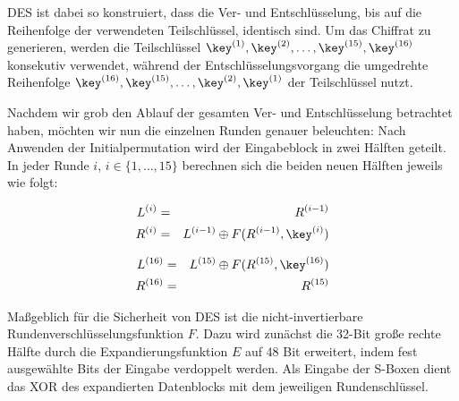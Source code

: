 DES ist dabei so konstruiert, dass die Ver- und Entschlüsselung, bis auf die Reihenfolge der verwendeten Teilschlüssel, identisch sind. Um das Chiffrat zu generieren, werden die Teilschlüssel $\key^{(1)},\key^{(2)},\dots,\key^{(15)},\key^{(16)}$ konsekutiv verwendet, während der Entschlüsselungsvorgang die umgedrehte Reihenfolge $\key^{(16)},\key^{(15)},\dots,\key^{(2)},\key^{(1)}$ der Teilschlüssel nutzt.

Nachdem wir grob den Ablauf der gesamten Ver- und Entschlüsselung betrachtet haben, möchten wir nun die einzelnen Runden genauer beleuchten: Nach Anwenden der Initialpermutation wird der Eingabeblock in zwei Hälften geteilt. In jeder Runde $i$, $i \in \{1,\ldots,15\}$ berechnen sich die beiden neuen Hälften jeweils wie folgt:

\noindent
\begin{minipage}[h]{.45\textwidth}
	\begin{eqnarray*}
		L^{(i)}	& =	& R^{(i-1)} \\
		R^{(i)} 	& =	& L^{(i-1)} \oplus F(R^{(i-1)}, \key^{(i)})
	\end{eqnarray*}
\end{minipage}\hfill
\begin{minipage}[h]{.45\textwidth}
	\begin{eqnarray*}
		L^{(16)} 	& =	& L^{(15)} \oplus F(R^{(15)}, \key^{(16)}) \\
		R^{(16)}	& =	& R^{(15)}
	\end{eqnarray*}
\end{minipage}
\bigskip

Maßgeblich für die Sicherheit von DES ist die nicht-invertierbare Rundenverschlüsselungsfunktion $F$. Dazu wird zunächst die 32-Bit große rechte Hälfte durch die Expandierungsfunktion $E$ auf 48 Bit erweitert, indem fest ausgewählte Bits der Eingabe verdoppelt werden. Als Eingabe der S-Boxen dient das XOR des expandierten Datenblocks mit dem jeweiligen Rundenschlüssel.

